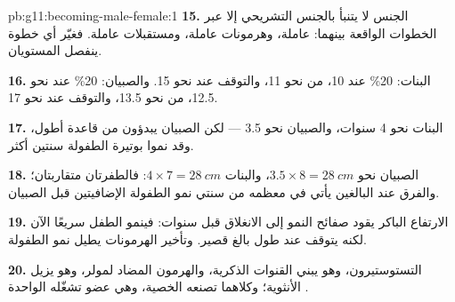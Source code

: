 \begin{solution}{pb:g11:becoming-male-female:1}
\textbf{15.} الجنس  لا يتنبأ بالجنس التشريحي إلا عبر الخطوات
الواقعة بينهما:  عاملة، وهرمونات عاملة، ومستقبلات عاملة. فغيّر أي
خطوة ينفصل المستويان.

\textbf{16.} البنات: 20\% عند 10،  من نحو 11، والتوقف عند نحو
15. والصبيان: 20\% عند نحو 12.5،  من نحو 13.5، والتوقف عند نحو 17.

\textbf{17.} البنات نحو 4 سنوات، والصبيان نحو 3.5 --- لكن الصبيان
يبدؤون من قاعدة أطول، وقد نموا بوتيرة الطفولة سنتين أكثر.

\textbf{18.} الصبيان نحو $3.5 \times 8 = \qty{28}{cm}$، والبنات $4 \times
7 = \qty{28}{cm}$: فالطفرتان متقاربتان؛ والفرق عند البالغين يأتي في
معظمه من سنتي نمو الطفولة الإضافيتين قبل  الصبيان.

\textbf{19.} الارتفاع الباكر يقود صفائح النمو إلى الانغلاق قبل سنوات:
فينمو الطفل سريعًا الآن لكنه يتوقف عند طول بالغ قصير. وتأخير الهرمونات
يطيل نمو الطفولة.

\textbf{20.} التستوستيرون، وهو يبني القنوات الذكرية، والهرمون المضاد
لمولر، وهو يزيل الأنثوية؛ وكلاهما تصنعه الخصية، وهي عضو تشغّله
 الواحدة .
\end{solution}

